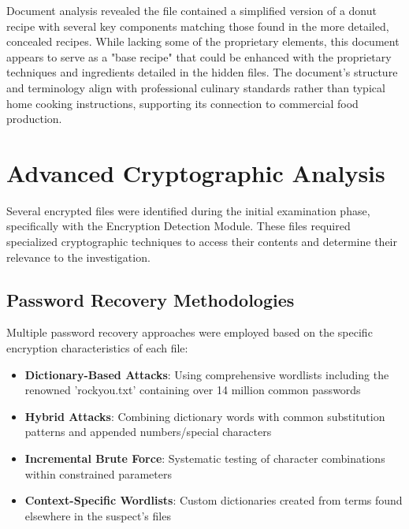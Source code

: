 Document analysis revealed the file contained a simplified version of a donut recipe with several key components matching those found in the more detailed, concealed recipes. While lacking some of the proprietary elements, this document appears to serve as a "base recipe" that could be enhanced with the proprietary techniques and ingredients detailed in the hidden files. The document's structure and terminology align with professional culinary standards rather than typical home cooking instructions, supporting its connection to commercial food production.

\section{Advanced Cryptographic Analysis}
Several encrypted files were identified during the initial examination phase, specifically with the Encryption Detection Module. These files required specialized cryptographic techniques to access their contents and determine their relevance to the investigation.

\subsection{Password Recovery Methodologies}
Multiple password recovery approaches were employed based on the specific encryption characteristics of each file:

\begin{itemize}
    \item \textbf{Dictionary-Based Attacks}: Using comprehensive wordlists including the renowned 'rockyou.txt' containing over 14 million common passwords
    \item \textbf{Hybrid Attacks}: Combining dictionary words with common substitution patterns and appended numbers/special characters
    \item \textbf{Incremental Brute Force}: Systematic testing of character combinations within constrained parameters
    \item \textbf{Context-Specific Wordlists}: Custom dictionaries created from terms found elsewhere in the suspect's files
\end{itemize}

